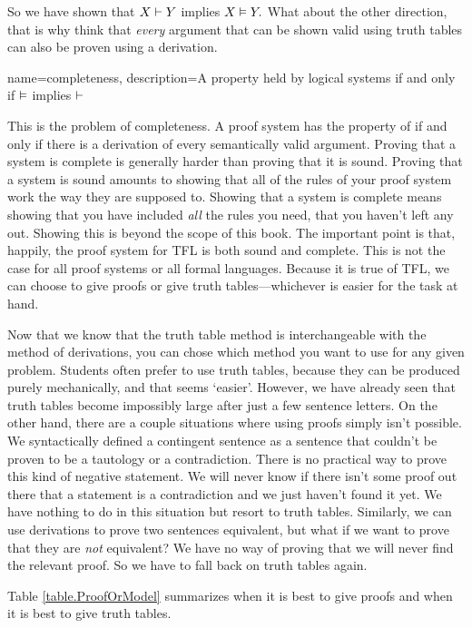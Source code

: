 So we have shown that $X \vdash  Y$ implies $X \vDash Y.$ What about the other direction, that is why think that \emph{every} argument that can be shown valid using truth tables can also be proven using a derivation. 

{
name=completeness,
description={A property held by logical systems if and only if $\vDash $ implies $\vdash $}
}

This is the problem of completeness. A proof system has the property of   \label{def:completeness} if and only if there is a derivation of every semantically valid argument. Proving that a system is complete is generally harder than proving that it is sound. Proving that a system is sound amounts to showing that all of the rules of your proof system work the way they are supposed to. Showing that a system is complete means showing that you have included \emph{all} the rules you need, that you haven't left any out. Showing this is beyond the scope of this book. The important point is that, happily, the proof system for TFL is both sound and complete. This is not the case for all proof systems or all formal languages. Because it is true of TFL, we can choose to give proofs or give truth tables---whichever is easier for the task at hand.

Now that we know that the truth table method is interchangeable with the method of derivations, you can chose which method you want to use for any given problem. Students often prefer to use truth tables, because they can be produced  purely mechanically, and that seems `easier'. However, we have already seen that truth tables become impossibly large after just a few sentence letters. On the other hand, there are a couple situations where using proofs simply isn't possible. We syntactically defined a contingent sentence as a sentence that couldn't be proven to be a tautology or a contradiction. There is no practical way to prove this kind of negative statement. We will never know if there isn't some proof out there that a statement is a contradiction and we just haven't found it yet. We have nothing to do in this situation but resort to truth tables. Similarly, we can use derivations to prove two sentences equivalent, but what if we want to prove that they are \emph{not} equivalent? We have no way of proving that we will never find the relevant proof. So we have to fall back on truth tables again.

Table \ref{table.ProofOrModel} summarizes when it is best to give proofs and when it is best to give truth tables. 

